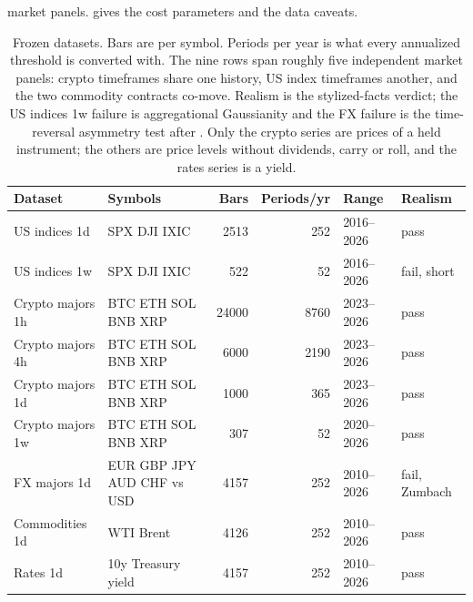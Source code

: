market panels.  gives the cost parameters and the data caveats.

\begin{table}[t]
\centering
\footnotesize
\setlength{\tabcolsep}{4pt}
\caption{Frozen datasets. Bars are per symbol. Periods per year is what every annualized threshold is converted with. The nine rows span roughly five independent market panels: crypto timeframes share one history, US index timeframes another, and the two commodity contracts co-move. Realism is the stylized-facts verdict; the US indices 1w failure is aggregational Gaussianity and the FX failure is the time-reversal asymmetry test after \citet{zumbach2009time}. Only the crypto series are prices of a held instrument; the others are price levels without dividends, carry or roll, and the rates series is a yield.}
\label{tab:data}
\begin{tabular}{llrrll}
\toprule
Dataset & Symbols & Bars & Periods/yr & Range & Realism \\
\midrule
US indices 1d & SPX DJI IXIC & 2513 & 252 & 2016--2026 & pass \\
US indices 1w & SPX DJI IXIC & 522 & 52 & 2016--2026 & fail, short \\
Crypto majors 1h & BTC ETH SOL BNB XRP & 24000 & 8760 & 2023--2026 & pass \\
Crypto majors 4h & BTC ETH SOL BNB XRP & 6000 & 2190 & 2023--2026 & pass \\
Crypto majors 1d & BTC ETH SOL BNB XRP & 1000 & 365 & 2023--2026 & pass \\
Crypto majors 1w & BTC ETH SOL BNB XRP & 307 & 52 & 2020--2026 & pass \\
FX majors 1d & EUR GBP JPY AUD CHF vs USD & 4157 & 252 & 2010--2026 & fail, Zumbach \\
Commodities 1d & WTI Brent & 4126 & 252 & 2010--2026 & pass \\
Rates 1d & 10y Treasury yield & 4157 & 252 & 2010--2026 & pass \\
\bottomrule
\end{tabular}
\end{table}
